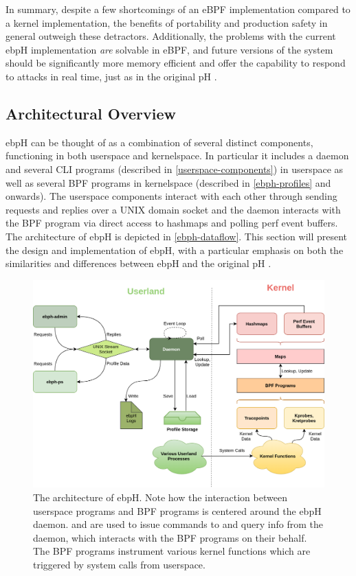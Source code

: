 \documentclass[
  12pt]{findlay}
\begin{document}
In summary, despite a few shortcomings of an eBPF implementation
compared to a kernel implementation, the benefits of portability and
production safety in general outweigh these detractors. Additionally,
the problems with the current ebpH implementation \emph{are} solvable in
eBPF, and future versions of the system should be significantly more
memory efficient and offer the capability to respond to attacks in real
time, just as in the original pH \autocite{soma02}.

\hypertarget{architectural-overview}{%
\subsection{Architectural Overview}\label{architectural-overview}}

ebpH can be thought of as a combination of several distinct components,
functioning in both userspace and kernelspace. In particular it includes
a daemon and several CLI programs (described in
\autoref{userspace-components}) in userspace as well as several BPF
programs in kernelspace (described in \autoref{ebph-profiles} and
onwards). The userspace components interact with each other through
sending requests and replies over a UNIX domain socket and the daemon
interacts with the BPF program via direct access to hashmaps and polling
perf event buffers. The architecture of ebpH is depicted in
\autoref{ebph-dataflow}. This section will present the design and
implementation of ebpH, with a particular emphasis on both the
similarities and differences between ebpH and the original pH
\autocite{soma02}.

\begin{figure}
    \caption[The architecture of ebpH]{
        The architecture of ebpH. Note how the interaction between userspace programs
        and BPF programs is centered around the ebpH daemon.  and 
        are used to issue commands to and query info from the daemon, which interacts with the BPF
        programs on their behalf. The BPF programs instrument various kernel functions which are triggered
        by system calls from userspace.
    }
    \label{ebph-dataflow}
    \includegraphics[height=.4\textheight]{../figures/ebph-dataflow.png}
\end{figure}
\end{document}
